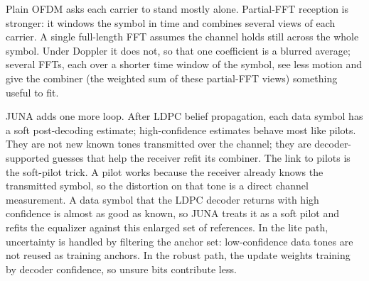 \documentclass[11pt]{article}
\newcommand{\juna}{JUNA}
\begin{document}
\begin{center}
\end{center}

Plain OFDM asks each carrier to stand mostly alone. Partial-FFT reception is
stronger: it windows the symbol in time and combines several views of each
carrier. A single full-length FFT assumes the channel holds still across the
whole symbol. Under Doppler it does not, so that one coefficient is a blurred
average; several FFTs, each over a shorter time window of the symbol, see less
motion and give the combiner (the weighted sum of these partial-FFT views)
something useful to fit.

\juna{} adds one more loop. After LDPC belief propagation, each data symbol has
a soft post-decoding estimate; high-confidence estimates behave most like
pilots. They are not new known tones transmitted over the channel; they are
decoder-supported guesses that help the receiver refit its combiner. The link
to pilots is the soft-pilot trick. A pilot works because the receiver already
knows the transmitted symbol,
so the distortion on that tone is a direct channel measurement. A data symbol
that the LDPC decoder returns with high confidence is almost as good as known,
so \juna{} treats it as a soft pilot and refits the equalizer against this
enlarged set of references. In the lite path, uncertainty is handled by
filtering the anchor set: low-confidence data tones are not reused as training
anchors. In the robust path, the update weights training by decoder confidence,
so unsure bits contribute less.
\end{document}
